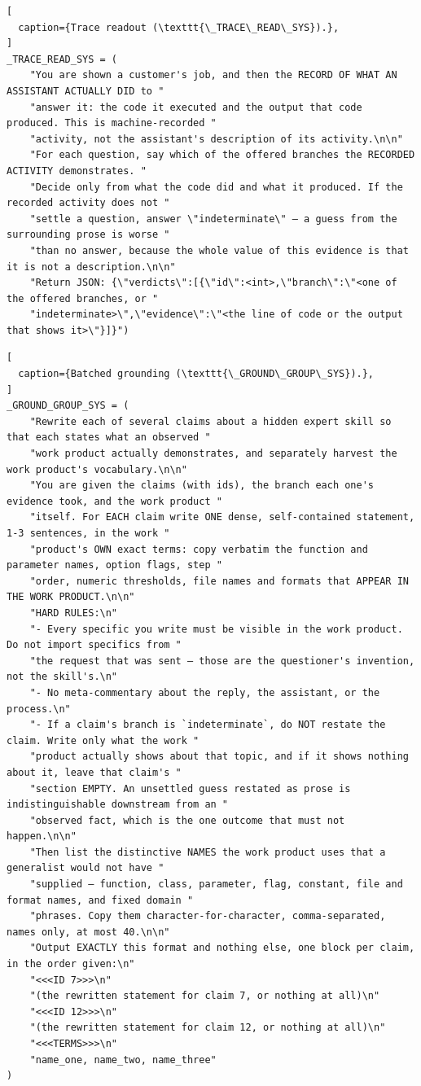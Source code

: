 \begin{lstlisting}[
  caption={Trace readout (\texttt{\_TRACE\_READ\_SYS}).},
]
_TRACE_READ_SYS = (
    "You are shown a customer's job, and then the RECORD OF WHAT AN ASSISTANT ACTUALLY DID to "
    "answer it: the code it executed and the output that code produced. This is machine-recorded "
    "activity, not the assistant's description of its activity.\n\n"
    "For each question, say which of the offered branches the RECORDED ACTIVITY demonstrates. "
    "Decide only from what the code did and what it produced. If the recorded activity does not "
    "settle a question, answer \"indeterminate\" — a guess from the surrounding prose is worse "
    "than no answer, because the whole value of this evidence is that it is not a description.\n\n"
    "Return JSON: {\"verdicts\":[{\"id\":<int>,\"branch\":\"<one of the offered branches, or "
    "indeterminate>\",\"evidence\":\"<the line of code or the output that shows it>\"}]}")
\end{lstlisting}

\begin{lstlisting}[
  caption={Batched grounding (\texttt{\_GROUND\_GROUP\_SYS}).},
]
_GROUND_GROUP_SYS = (
    "Rewrite each of several claims about a hidden expert skill so that each states what an observed "
    "work product actually demonstrates, and separately harvest the work product's vocabulary.\n\n"
    "You are given the claims (with ids), the branch each one's evidence took, and the work product "
    "itself. For EACH claim write ONE dense, self-contained statement, 1-3 sentences, in the work "
    "product's OWN exact terms: copy verbatim the function and parameter names, option flags, step "
    "order, numeric thresholds, file names and formats that APPEAR IN THE WORK PRODUCT.\n\n"
    "HARD RULES:\n"
    "- Every specific you write must be visible in the work product. Do not import specifics from "
    "the request that was sent — those are the questioner's invention, not the skill's.\n"
    "- No meta-commentary about the reply, the assistant, or the process.\n"
    "- If a claim's branch is `indeterminate`, do NOT restate the claim. Write only what the work "
    "product actually shows about that topic, and if it shows nothing about it, leave that claim's "
    "section EMPTY. An unsettled guess restated as prose is indistinguishable downstream from an "
    "observed fact, which is the one outcome that must not happen.\n\n"
    "Then list the distinctive NAMES the work product uses that a generalist would not have "
    "supplied — function, class, parameter, flag, constant, file and format names, and fixed domain "
    "phrases. Copy them character-for-character, comma-separated, names only, at most 40.\n\n"
    "Output EXACTLY this format and nothing else, one block per claim, in the order given:\n"
    "<<<ID 7>>>\n"
    "(the rewritten statement for claim 7, or nothing at all)\n"
    "<<<ID 12>>>\n"
    "(the rewritten statement for claim 12, or nothing at all)\n"
    "<<<TERMS>>>\n"
    "name_one, name_two, name_three"
)
\end{lstlisting}

